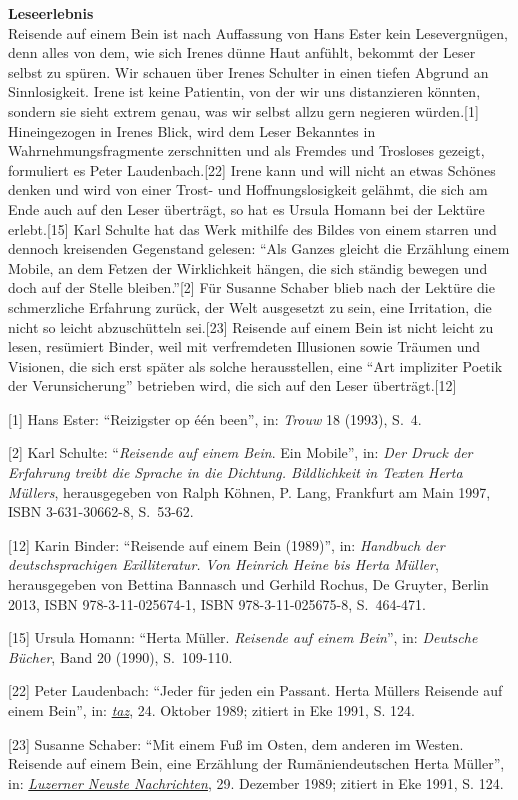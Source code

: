 \documentclass[fontsize=12pt]{scrartcl}
\begin{document}
\textbf{Leseerlebnis}\\
Reisende auf einem Bein ist nach Auffassung von Hans Ester kein Lesevergn\"ugen, denn alles von dem, wie sich Irenes d\"unne Haut anf\"uhlt, bekommt der Leser \mbox{selbst} zu sp\"uren. Wir schauen \"uber Irenes Schulter in einen tiefen Abgrund an Sinnlosigkeit. Irene ist keine Patientin, von der wir uns distanzieren k\"onnten, sondern sie sieht extrem genau, was wir \mbox{selbst} allzu gern negieren w\"urden.[1] Hineingezogen in Irenes Blick, wird dem Leser Bekanntes in Wahrnehmungsfragmente zerschnitten und als Fremdes und Trosloses gezeigt, formuliert es Peter Laudenbach.[22] Irene kann und will nicht an etwas Sch\"ones denken und wird von einer Trost- und Hoffnungslosigkeit gel\"ahmt, die sich am Ende auch auf den Leser \"ubertr\"agt, so hat es Ursula Homann bei der Lekt\"ure erlebt.[15] Karl Schulte hat das Werk mithilfe des Bildes von einem starren und dennoch kreisenden Gegenstand gelesen: "`Als Ganzes gleicht die Erz\"ahlung einem Mobile, an dem Fetzen der Wirklichkeit h\"angen, die sich st\"andig bewegen und doch auf der Stelle bleiben."'[2] F\"ur Susanne Schaber blieb nach der Lekt\"ure die schmerzliche Erfah\-rung zur\"uck, der Welt ausgesetzt zu sein, eine Irritation, die nicht so leicht abzusch\"utteln sei.[23] Reisende auf einem Bein ist nicht leicht zu lesen, res\"umiert Binder, weil mit verfremdeten Illusionen sowie Tr\"aumen und Visionen, die sich erst sp\"ater als solche he\-rausstellen, eine "`Art impliziter \flq Poetik der Verunsicherung\frq"' betrieben wird, die sich auf den Leser \"ubertr\"agt.[12]

{\tiny[1] Hans Ester: "`Reizigster op \'{e}\'{e}n been"', in: \textit{Trouw} 18 (1993), S. 4.\par}
{\tiny[2] Karl Schulte: "`\textit{Reisende auf einem Bein}. Ein Mobile"', in: \textit{Der Druck der Erfah\-rung treibt die Sprache in die Dichtung. Bildlichkeit in Texten Herta M\"ullers}, he\-rausgegeben von Ralph K\"ohnen, P. Lang, Frankfurt am Main 1997, ISBN 3-631-30662-8, S. 53-62.\par}
{\tiny[12] Karin Binder: "`Reisende auf einem Bein (1989)"', in: \textit{Handbuch der deutschspra\-chi\-gen Exilli\-te\-ra\-tur. Von Heinrich Heine bis Herta M\"uller}, he\-rausgegeben von Bettina Bannasch und Gerhild Rochus, De Gruyter, Berlin 2013, ISBN 978-3-11-025674-1, ISBN 978-3-11-025675-8, S. 464-471.\par}
{\tiny[15] Ursula Homann: "`Herta M\"uller. \textit{Reisende auf einem Bein}"', in: \textit{Deutsche B\"ucher}, Band 20 (1990), S. 109-110.\par}
{\tiny[22] Peter Laudenbach: "`Jeder f\"ur jeden ein Passant. Herta M\"ullers Reisende auf einem Bein"', in: \href{https://de.wikipedia.org/wiki/Die_Tageszeitung}{\textit{taz}}, 24. Oktober 1989; zitiert in Eke 1991, S. 124.\par}
{\tiny[23] Susanne Schaber: "`Mit einem Fuß im Osten, dem anderen im Westen. Reisende auf einem Bein, eine Erz\"ahlung der Rum\"aniendeut\-schen Herta M\"uller"', in: \href{https://de.wikipedia.org/wiki/Neue_Luzerner_Zeitung}{\textit{Luzerner Neuste Nachrichten}}, 29. Dezember 1989; zitiert in Eke 1991, S. 124.\par}
\end{document}
